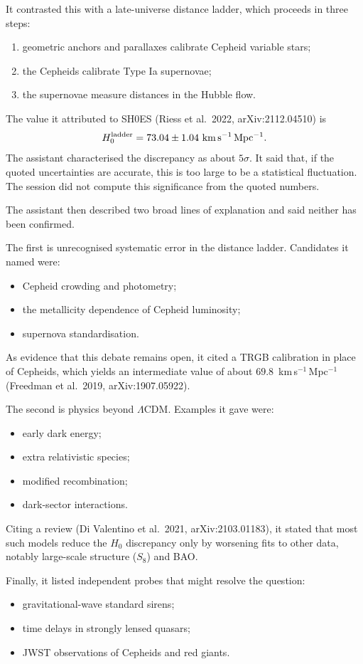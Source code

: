 \documentclass[11pt,a4paper]{article}
\begin{document}
It contrasted this with a late-universe distance ladder, which proceeds in three steps:
\begin{enumerate}
\item geometric anchors and parallaxes calibrate Cepheid variable stars;
\item the Cepheids calibrate Type Ia supernovae;
\item the supernovae measure distances in the Hubble flow.
\end{enumerate}
The value it attributed to SH0ES (Riess et al.\ 2022, arXiv:2112.04510) is
\begin{equation}
H_0^{\rm ladder} = 73.04 \pm 1.04~\mathrm{km\,s^{-1}\,Mpc^{-1}}.
\end{equation}
The assistant characterised the discrepancy as about $5\sigma$. It said that, if the quoted uncertainties are accurate, this is too large to be a statistical fluctuation. The session did not compute this significance from the quoted numbers.

The assistant then described two broad lines of explanation and said neither has been confirmed.

The first is unrecognised systematic error in the distance ladder. Candidates it named were:
\begin{itemize}
\item Cepheid crowding and photometry;
\item the metallicity dependence of Cepheid luminosity;
\item supernova standardisation.
\end{itemize}
As evidence that this debate remains open, it cited a TRGB calibration in place of Cepheids, which yields an intermediate value of about $69.8$~km\,s$^{-1}$\,Mpc$^{-1}$ (Freedman et al.\ 2019, arXiv:1907.05922).

The second is physics beyond $\Lambda$CDM. Examples it gave were:
\begin{itemize}
\item early dark energy;
\item extra relativistic species;
\item modified recombination;
\item dark-sector interactions.
\end{itemize}
Citing a review (Di Valentino et al.\ 2021, arXiv:2103.01183), it stated that most such models reduce the $H_0$ discrepancy only by worsening fits to other data, notably large-scale structure ($S_8$) and BAO.

Finally, it listed independent probes that might resolve the question:
\begin{itemize}
\item gravitational-wave standard sirens;
\item time delays in strongly lensed quasars;
\item JWST observations of Cepheids and red giants.
\end{itemize}
\end{document}
